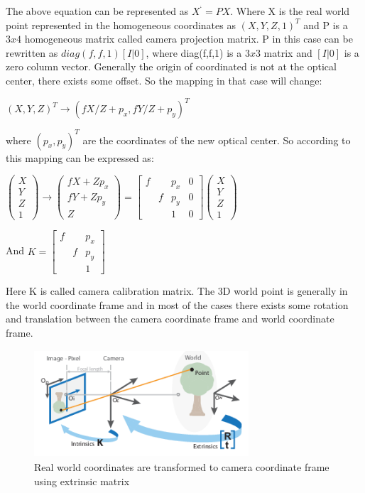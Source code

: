 The above equation can be represented as  $X^{‘} = PX $. Where X is the real world point represented in the homogeneous coordinates as $(X, Y, Z, 1)^{T}$ and P is a $3x4$ homogeneous matrix called camera projection matrix. P in this case can be rewritten as $diag(f,f,1) [I|0]$, where diag(f,f,1) is a $3x3$ matrix and $[I|0]$ is a zero column vector. 
Generally the origin of coordinated is not at the optical center, there exists some offset. So the mapping in that case will change: 
\begin{center}
$(X,Y,Z)^{T} \rightarrow (fX/Z + p_{x}, fY/Z + p_{y})^{T}$
\end{center}
 where $(p_{x}, p_{y})^{T}$ are the coordinates of the new optical center. So according to this mapping can be expressed as:
   \begin{center}
$\left(\begin{array}{c}X \\ Y \\ Z \\ 1 \end{array}\right) \rightarrow \left(\begin{array}{c} fX + Zp_{x} \\ fY + Zp_{y} \\ Z \end{array}\right) = \begin{bmatrix}f & &p_{x} & 0 \\  &f &p_{y} & 0  \\   & &1 & 0   \end{bmatrix}\left(\begin{array}{c}X\\ Y  \\Z \\ 1 \end{array}\right)$

And $ K =  \begin{bmatrix}f & &p_{x} \\  &f &p_{y}  \\   & &1    \end{bmatrix}$
\end{center}
 Here K is called camera calibration matrix. The 3D world point is generally in the world coordinate frame and in most of the cases there exists some rotation and translation between the camera coordinate frame and world coordinate frame.
 
    \begin{figure}[h]
    \centering
    \includegraphics[width=8cm, height =4cm]{images/camera_geo.png}
    \caption{ Real world coordinates are transformed to camera coordinate frame using extrinsic matrix \cite{10.5555/861369}}
    \end{figure}
    
